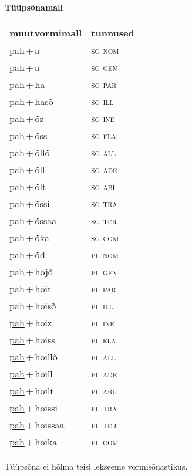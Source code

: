 
\vspace{1.8em}
\begin{minipage}{\textwidth}
\textbf{Tüüpsõnamall \,}\\

\begin{sideways}
\begin{tabular}{l l}
muutvormimall & tunnused \\
\hline
\underline{pah}\,+\,a & \textsc{ sg nom } \\
\underline{pah}\,+\,a & \textsc{ sg gen } \\
\underline{pah}\,+\,ha & \textsc{ sg par } \\
\underline{pah}\,+\,hasõ & \textsc{ sg ill } \\
\underline{pah}\,+\,õz & \textsc{ sg ine } \\
\underline{pah}\,+\,õss & \textsc{ sg ela } \\
\underline{pah}\,+\,õllõ & \textsc{ sg all } \\
\underline{pah}\,+\,õll & \textsc{ sg ade } \\
\underline{pah}\,+\,õlt & \textsc{ sg abl } \\
\underline{pah}\,+\,õssi & \textsc{ sg tra } \\
\underline{pah}\,+\,õssaa & \textsc{ sg ter } \\
\underline{pah}\,+\,õka & \textsc{ sg com } \\
\underline{pah}\,+\,õd & \textsc{ pl nom } \\
\underline{pah}\,+\,hojõ & \textsc{ pl gen } \\
\underline{pah}\,+\,hoit & \textsc{ pl par } \\
\underline{pah}\,+\,hoisõ & \textsc{ pl ill } \\
\underline{pah}\,+\,hoiz & \textsc{ pl ine } \\
\underline{pah}\,+\,hoiss & \textsc{ pl ela } \\
\underline{pah}\,+\,hoillõ & \textsc{ pl all } \\
\underline{pah}\,+\,hoill & \textsc{ pl ade } \\
\underline{pah}\,+\,hoilt & \textsc{ pl abl } \\
\underline{pah}\,+\,hoissi & \textsc{ pl tra } \\
\underline{pah}\,+\,hoissaa & \textsc{ pl ter } \\
\underline{pah}\,+\,hoika & \textsc{ pl com } \\
\end{tabular}
\end{sideways}
\label{tab:tüüpsõnamall-paha}

\end{minipage}

 
\vspace{1em}
\noindent Tüüpsõna ei hõlma teisi lekseeme vormi\-sõnastikus.
